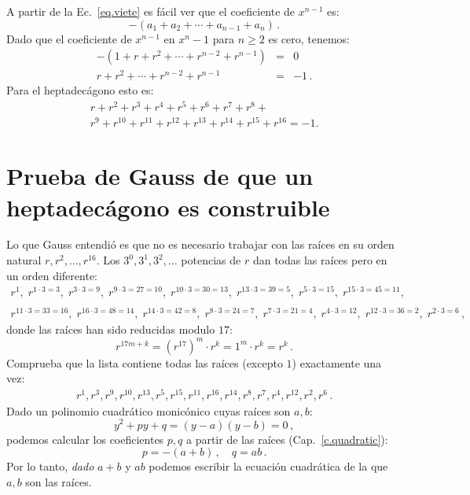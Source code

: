 A partir de la Ec.~\ref{eq.viete} es fácil ver que el coeficiente de $x^{n-1}$ es:
\[
-(a_1+a_2+\cdots+a_{n-1}+a_n)\,.
\]
Dado que el coeficiente de $x^{n-1}$ en $x^n-1$ para $n\geq 2$ es cero, tenemos:
\begin{eqnarray*}
-(1+r+r^2+\cdots + r^{n-2}+r^{n-1})&=&0\\
r+r^2+\cdots + r^{n-2}+r^{n-1}&=&-1\,.
\end{eqnarray*}
Para el heptadecágono esto es:
\begin{multline}
r+r^2+r^3+r^4+r^5+r^6+r^7+r^8+\\
r^9+r^{10}+r^{11}+r^{12}+r^{13}+r^{14} + r^{15}+r^{16}=-1.\label{eq.minus-one}
\end{multline}

\section{Prueba de Gauss de que un heptadecágono es construible}\label{s.gauss}

Lo que Gauss entendió es que no es necesario trabajar con las raíces en su orden natural $r,r^2,\ldots,r^{16}$. Los $3^0, 3^1, 3^2, \ldots$ potencias de $r$ dan todas las raíces pero en un orden diferente:
\[
\begin{array}{l}
r^1, \;r^{1\cdot 3 =3},\; r^{3\cdot 3=9},\; r^{9\cdot 3=27=10},\; r^{10\cdot 3=30=13},\; r^{13\cdot 3=39=5},\; r^{5\cdot 3=15},\; r^{15\cdot 3=45=11},\\\\
r^{11\cdot 3 =33=16}, \;r^{16\cdot 3=48=14},\; r^{14\cdot 3=42=8},\; r^{8\cdot 3=24=7},\;r^{7\cdot 3=21=4},\; r^{4\cdot 3=12},\; r^{12\cdot 3=36=2},\; r^{2\cdot 3=6}\,,
\end{array}
\]
donde las raíces han sido reducidas modulo $17$:
\[
r^{17m+k}=(r^{17})^m\cdot r^k=1^m\cdot r^k=r^k\,.
\]
Comprueba que la lista contiene todas las raíces (excepto $1$) exactamente una vez:
\begin{align}\label{eq.roots}
r^1, r^3, r^9, r^{10}, r^{13}, r^5, r^{15}, r^{11}, r^{16}, r^{14}, r^8, r^7, r^4, r^{12}, r^2, r^6\,.
\end{align}
Dado un polinomio cuadrático monicónico cuyas raíces son $a,b$:
\[
y^2+py+q=(y-a)(y-b)=0\,,
\]
podemos calcular los coeficientes $p,q$ a partir de las raíces (Cap.~\ref{c.quadratic}):
\[
p=-(a+b)\,,\quad q=ab\,.
\]
Por lo tanto, \emph{dado} $a+b$ y $ab$ podemos escribir la ecuación cuadrática de la que $a,b$ son las raíces.

